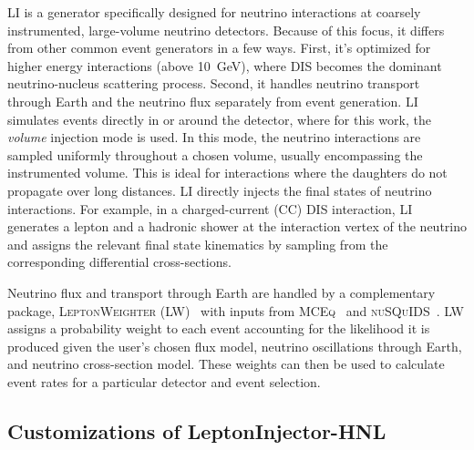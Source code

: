 \documentclass[
    aps,
    prd,
    reprint,
    amsmath,
    amssymb,
    nofootinbib,
    superscriptaddress,
    floatfix
]{revtex4-2}
\newcommand{\gev}{\giga\electronvolt}
\begin{document}
LI is a generator specifically designed for neutrino interactions at coarsely instrumented, large-volume neutrino detectors.
Because of this focus, it differs from other common event generators in a few ways.
First, it's optimized for higher energy interactions (above \SI{10}{\gev}), where DIS becomes the dominant neutrino-nucleus scattering process.
Second, it handles neutrino transport through Earth and the neutrino flux separately from event generation.
LI simulates events directly in or around the detector, where for this work, the \textit{volume} injection mode is used.
In this mode, the neutrino interactions are sampled uniformly throughout a chosen volume, usually encompassing the instrumented volume.
This is ideal for interactions where the daughters do not propagate over long distances.
LI directly injects the final states of neutrino interactions. For example, in a charged-current (CC) DIS interaction, LI generates a lepton and a hadronic shower at the interaction vertex of the neutrino and assigns the relevant final state kinematics by sampling from the corresponding differential cross-sections.

Neutrino flux and transport through Earth are handled by a complementary package, \textsc{LeptonWeighter} (LW)~\cite{IceCube:2020tcq} with inputs from \textsc{MCEq}~\cite{Fedynitch:2018cbl} and \textsc{nuSQuIDS}~\cite{Arguelles:2021twb}.
LW assigns a probability weight to each event accounting for the likelihood it is produced given the user's chosen flux model, neutrino oscillations through Earth, and neutrino cross-section model.
These weights can then be used to calculate event rates for a particular detector and event selection.


\subsection{Customizations of LeptonInjector-HNL}
\end{document}

